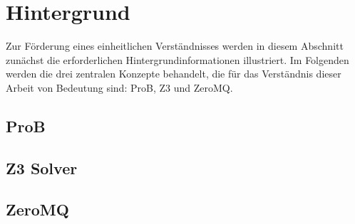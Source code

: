 

\section{Hintergrund}

Zur Förderung eines einheitlichen Verständnisses werden in diesem Abschnitt zunächst die erforderlichen Hintergrundinformationen illustriert.
Im Folgenden werden die drei zentralen Konzepte behandelt, die für das Verständnis dieser Arbeit von Bedeutung sind: ProB, Z3 und ZeroMQ.

\subsection{ProB}
\cite{10.1007/978-3-540-45236-2_46}





\subsection{Z3 Solver}
\cite{10.1007/978-3-031-65627-9_2} \cite{10.1007/978-3-540-78800-3_24}





\subsection{ZeroMQ}
\label{sec:zeromq}
\cite{hintjens2013zeromq} \cite{sustrik2015zeromq}
